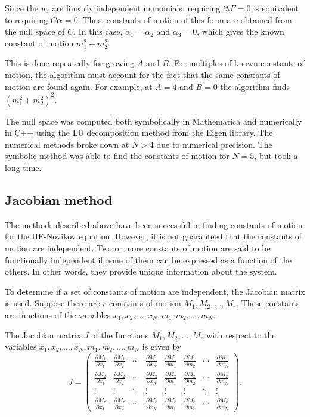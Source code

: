 \documentclass[english,master]{liumaiex}
\theoremstyle{thesisplain}
\theoremstyle{thesisdefinition}
\numberwithin{equation}{section}
\begin{document}
Since the $w_i$ are linearly independent monomials, requiring $\partial_t F = 0$ is equivalent to requiring $C \boldsymbol{\alpha} = 0$. Thus, constants of motion of this form are obtained from the null space of $C$. In this case, $\alpha_1 = \alpha_2$ and $\alpha_3 = 0$, which gives the known constant of motion $m_1^2 + m_2^2$.

This is done repeatedly for growing $A$ and $B$. For multiples of known constants of motion, the algorithm must account for the fact that the same constants of motion are found again. For example, at $A = 4$ and $B = 0$ the algorithm finds $(m_1^2 + m_2^2)^2$.

The null space was computed both symbolically in Mathematica and numerically in C++ using the LU decomposition method from the Eigen library. The numerical methods broke down at $N > 4$ due to numerical precision. The symbolic method was able to find the constants of motion for $N = 5$, but took a long time.

\subsection*{Jacobian method}
The methods described above have been successful in finding constants of motion for the HF-Novikov equation. However, it is not guaranteed that the constants of motion are independent. Two or more constants of motion are said to be functionally independent if none of them can be expressed as a function of the others. In other words, they provide unique information about the system.

To determine if a set of constants of motion are independent, the Jacobian matrix is used. Suppose there are $r$ constants of motion $M_1,M_2,\dots,M_r$. These constants are functions of the variables $x_1,x_2,\dots,x_N,m_1,m_2,\dots,m_N$.

The Jacobian matrix $J$ of the functions $M_1,M_2,\dots,M_r$ with respect to the variables $x_1,x_2,\dots,x_N,m_1,m_2,\dots,m_N$ is given by
\begin{equation}
	J =
	\begin{pmatrix}
		\frac{\partial M_1}{\partial x_1} & \frac{\partial M_1}{\partial x_2} & \cdots & \frac{\partial M_1}{\partial x_N} & \frac{\partial M_1}{\partial m_1} & \frac{\partial M_1}{\partial m_2} & \cdots & \frac{\partial M_1}{\partial m_N} \\
		\frac{\partial M_2}{\partial x_1} & \frac{\partial M_2}{\partial x_2} & \cdots & \frac{\partial M_2}{\partial x_N} & \frac{\partial M_2}{\partial m_1} & \frac{\partial M_2}{\partial m_2} & \cdots & \frac{\partial M_2}{\partial m_N} \\
		\vdots & \vdots & \ddots & \vdots & \vdots & \vdots & \ddots & \vdots \\
		\frac{\partial M_r}{\partial x_1} & \frac{\partial M_r}{\partial x_2} & \cdots & \frac{\partial M_r}{\partial x_N} & \frac{\partial M_r}{\partial m_1} & \frac{\partial M_r}{\partial m_2} & \cdots & \frac{\partial M_r}{\partial m_N}
	\end{pmatrix}.
\end{equation}
\end{document}

